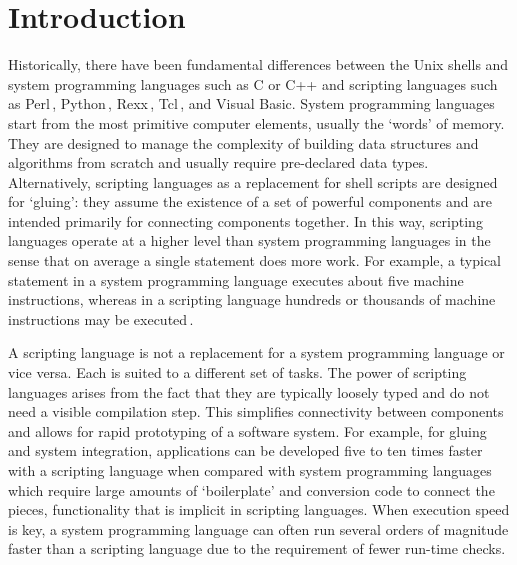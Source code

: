 \documentclass[12pt]{article}
\begin{document}
\section{Introduction}

Historically, there have been fundamental differences between the Unix
shells and system programming languages such as C or C++ and
scripting languages such as
Perl\,\cite{wall99:_perl_progr_refer_guide},
Python\,\cite{martelli06:_python_nutsh},
Rexx\,\cite{ohara88:_moder_progr_using_rexx},
Tcl\,\cite{ousterhout94:_tcl_tk_toolk}, and Visual Basic.  System
programming languages start from the most primitive computer elements, usually the `words' of memory. They are designed to manage the complexity of
building data structures and algorithms from scratch and usually
require pre-declared data types.  Alternatively, scripting languages
as a replacement for shell scripts are designed for `gluing': they
assume the existence of a set of powerful components and are
intended primarily for connecting components together.
In this way, scripting languages operate at a higher level than system programming
languages in the sense that on average a single statement does more
work. For example, a typical statement in a system programming
language executes about five machine instructions, whereas in a
scripting language hundreds or thousands of machine instructions may
be executed\,\cite{ousterhout98:_scrip}.


A scripting language is not a replacement for a system programming
language or vice versa. Each is suited to a different set of tasks. The power of scripting languages arises from the fact that they are typically loosely typed and do not need a
visible compilation step. This simplifies connectivity between components
and allows for rapid prototyping of a software system.
For example, for gluing and system integration, applications can be developed
five to ten times faster with a scripting language when compared with system programming languages which
require large amounts of `boilerplate' and conversion code to connect
the pieces, functionality that is implicit in scripting languages. When
execution speed is key, a system programming language can often run
several orders of magnitude faster than a scripting language due to the requirement of
fewer run-time checks.
\end{document}
